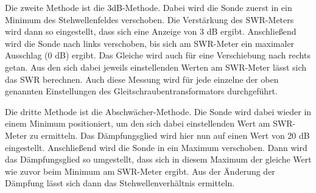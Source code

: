 Die zweite Methode ist die 3dB-Methode. Dabei wird die Sonde zuerst in ein Minimum
des Stehwellenfeldes verschoben. Die Verstärkung des SWR-Meters wird dann so eingestellt,
dass sich eine Anzeige von 3 dB ergibt. Anschließend wird die Sonde nach links verschoben,
bis sich am SWR-Meter ein maximaler Ausschlag (0 dB) ergibt. Das Gleiche wird auch für
eine Verschiebung nach rechts getan. Aus den sich dabei jeweils einstellenden Werten am SWR-Meter
lässt sich das SWR berechnen. Auch diese Messung wird für jede einzelne der oben genannten Einstellungen
des Gleitschraubentransformators durchgeführt.

Die dritte Methode ist die Abschwächer-Methode. Die Sonde wird dabei wieder in einem
Minimum positioniert, um den sich dabei einstellenden Wert am SWR-Meter zu ermitteln.
Das Dämpfungsglied wird hier nun auf einen Wert von 20 dB eingestellt.
Anschließend wird die Sonde in ein Maximum verschoben. Dann wird das Dämpfungsglied
so umgestellt, dass sich in diesem Maximum der gleiche Wert wie zuvor beim Minimum
am SWR-Meter ergibt. Aus der Änderung der Dämpfung lässt sich dann das Stehwellenverhältnis
ermitteln.
